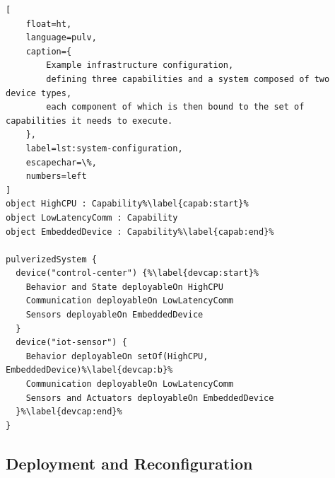 \documentclass[conference]{IEEEtran}
\begin{document}
%

\begin{lstlisting}[
    float=ht,
    language=pulv,
    caption={
        Example infrastructure configuration,
        defining three capabilities and a system composed of two device types,
        each component of which is then bound to the set of capabilities it needs to execute.
    },
    label=lst:system-configuration,
    escapechar=\%,
    numbers=left
]
object HighCPU : Capability%\label{capab:start}%
object LowLatencyComm : Capability
object EmbeddedDevice : Capability%\label{capab:end}%

pulverizedSystem {
  device("control-center") {%\label{devcap:start}%
    Behavior and State deployableOn HighCPU
    Communication deployableOn LowLatencyComm
    Sensors deployableOn EmbeddedDevice
  }
  device("iot-sensor") {
    Behavior deployableOn setOf(HighCPU, EmbeddedDevice)%\label{devcap:b}%
    Communication deployableOn LowLatencyComm
    Sensors and Actuators deployableOn EmbeddedDevice
  }%\label{devcap:end}%
}
\end{lstlisting}


\subsection{Deployment and Reconfiguration}
\end{document}
